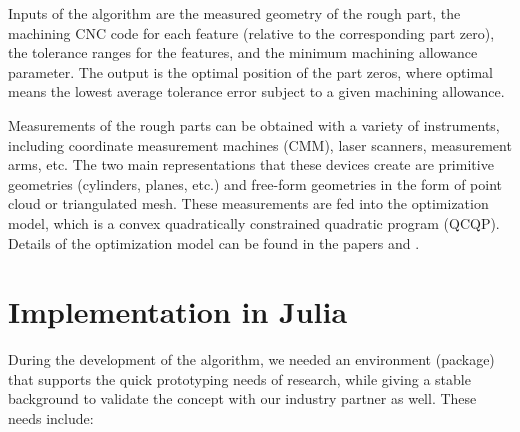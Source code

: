 \documentclass{juliacon}
\begin{document}
Inputs of the algorithm are the measured geometry of the rough part, the machining CNC code for each feature (relative to the corresponding part zero), the tolerance ranges for the features, and the minimum machining allowance parameter.
The output is the optimal position of the part zeros, where optimal means the lowest average tolerance error subject to a given machining allowance.

Measurements of the rough parts can be obtained with a variety of instruments, including coordinate measurement machines (CMM), laser scanners, measurement arms, etc.
The two main representations that these devices create are primitive geometries (cylinders, planes, etc.) and free-form geometries in the form of point cloud or triangulated mesh.
These measurements are fed into the optimization model, which is a convex quadratically constrained quadratic program (QCQP).
Details of the optimization model can be found in the papers \cite{cserteg:2023_Annals} and \cite{cserteg:2023_CMS}.

\section{Implementation in Julia}
\label{sec:approach}

During the development of the algorithm, we needed an environment (package) that supports the quick prototyping needs of research, while giving a stable background to validate the concept with our industry partner as well.
These needs include:
\end{document}
